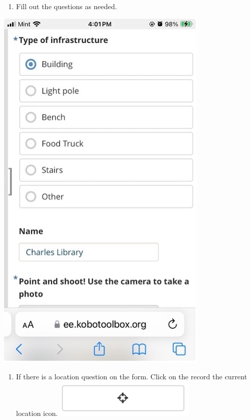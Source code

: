 \documentclass[
  letterpaper,
  DIV=11,
  numbers=noendperiod]{scrartcl}
\providecommand{\tightlist}{%
  \setlength{\itemsep}{0pt}\setlength{\parskip}{0pt}}\usepackage{longtable,booktabs,array}
\begin{document}
\begin{enumerate}
\def\labelenumi{\arabic{enumi}.}
\setcounter{enumi}{1}
\tightlist
\item
  Fill out the questions as needed.
\end{enumerate}

\includegraphics{kobotoolbox_tutorial_files/img/img16.jpg}

\begin{enumerate}
\def\labelenumi{\arabic{enumi}.}
\setcounter{enumi}{2}
\tightlist
\item
  If there is a location question on the form. Click on the record the
  current location icon.
  \includegraphics{kobotoolbox_tutorial_files/img/img17_1.png}
\end{enumerate}
\end{document}
